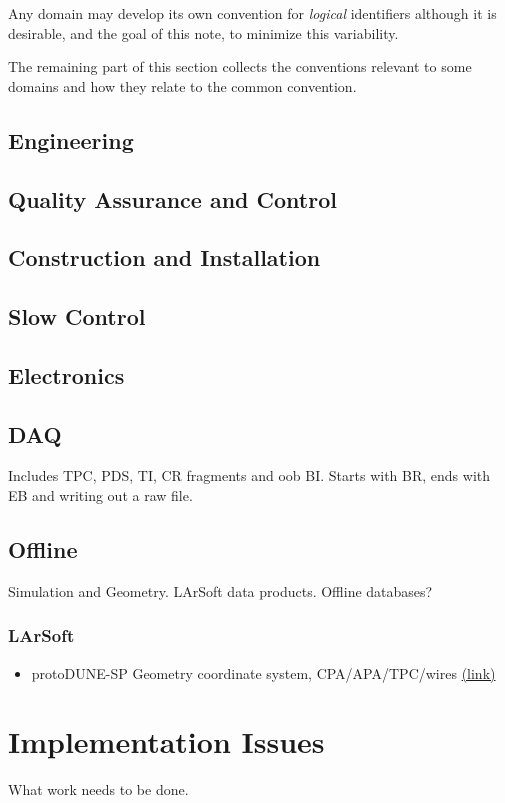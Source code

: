 \documentclass[letterpaper,twoside,onecolumn,report]{memoir}
\begin{document}
Any domain may develop its own convention for \textit{logical}
identifiers although it is desirable, and the goal of this note, to
minimize this variability.

The remaining part of this section collects the conventions relevant
to some domains and how they relate to the common convention.

\subsection{Engineering}
\label{sec:eng}



\subsection{Quality Assurance and Control}
\label{sec:qaqc}

\subsection{Construction and Installation}
\label{sec:inst}

\subsection{Slow Control}
\label{sec:slow}

\subsection{Electronics}
\label{sec:elec}

\subsection{DAQ}
\label{sec:daq}

Includes TPC, PDS, TI, CR fragments and oob BI.  Starts with BR, ends
with EB and writing out a raw file.

\subsection{Offline}
\label{sec:offline}

Simulation and Geometry.  LArSoft data products.  Offline databases?

\subsubsection{LArSoft}

\begin{itemize}
\item protoDUNE-SP Geometry coordinate system, CPA/APA/TPC/wires \href{https://cdcvs.fnal.gov/redmine/projects/dunetpc/wiki/DUNE_Geometries#ProtoDUNE-SP-Geometry}{(link)}
\end{itemize}

\section{Implementation Issues}
\label{sec:impl}

What work needs to be done.
\end{document}
